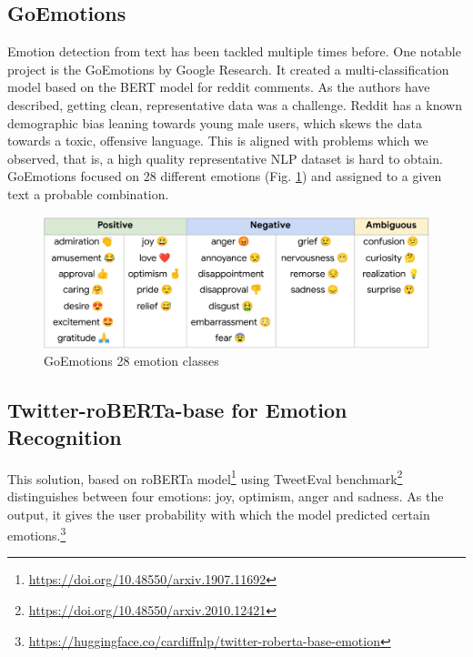 \documentclass{ledger}
\begin{document}
\subsection{GoEmotions}
Emotion detection from text has been tackled multiple times before. One notable project is the GoEmotions by Google Research. It created a multi-classification model based on the BERT model for reddit comments. As the authors have described, getting clean, representative data was a challenge\cite{https://doi.org/10.48550/arxiv.2005.00547}. Reddit has a known demographic bias leaning towards young male users, which skews the data towards a toxic, offensive language. This is aligned with problems which we observed, that is, a high quality representative NLP dataset is hard to obtain. GoEmotions focused on 28 different emotions (Fig. \ref{fig:goemotions-classes}) and assigned to a given text a probable combination.

\begin{figure}[H]
	\centering
	\includegraphics[width=1\textwidth]{assets/goemotions_classes.png}
	\caption{GoEmotions 28 emotion classes}
	\label{fig:goemotions-classes}
\end{figure}

\subsection{Twitter-roBERTa-base for Emotion Recognition}
This solution, based on roBERTa model\footnote[3]{\url{https://doi.org/10.48550/arxiv.1907.11692}} using TweetEval benchmark\footnote[4]{\url{https://doi.org/10.48550/arxiv.2010.12421}} distinguishes between four emotions: joy, optimism, anger and sadness. As the output, it gives the user probability with which the model predicted certain emotions.\footnote[2]{\url{https://huggingface.co/cardiffnlp/twitter-roberta-base-emotion}}
\end{document}
